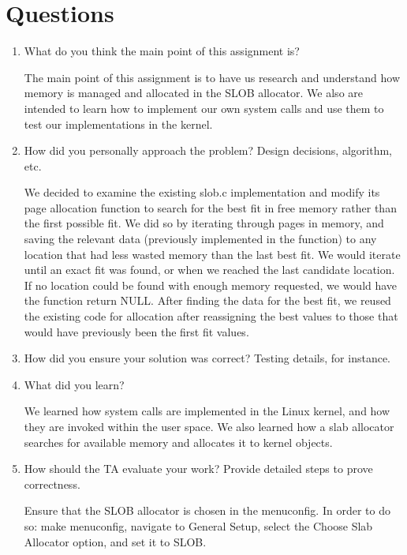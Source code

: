 \documentclass[letterpaper,10pt,fleqn]{article}
\begin{document}
\section*{Questions}
\begin{enumerate}
\item What do you think the main point of this assignment is?

The main point of this assignment is to have us research and understand how memory is managed and allocated in the SLOB allocator. We also are intended to learn how to implement our own system calls and use them to test our implementations in the kernel.

\item How did you personally approach the problem? Design decisions, algorithm, etc. 

We decided to examine the existing slob.c implementation and modify its page allocation function to search for the best fit in free memory rather than the first possible fit. We did so by iterating through pages in memory, and saving the relevant data (previously implemented in the function) to any location that had less wasted memory than the last best fit. We would iterate until an exact fit was found, or when we reached the last candidate location. If no location could be found with enough memory requested, we would have the function return NULL. 
After finding the data for the best fit, we reused the existing code for allocation after reassigning the best values to those that would have previously been the first fit values.

\item How did you ensure your solution was correct? Testing details, for instance. 



\item What did you learn? 

We learned how system calls are implemented in the Linux kernel, and how they are invoked within the user space. We also learned how a slab allocator searches for available memory and allocates it to kernel objects.

\item How should the TA evaluate your work? Provide detailed steps to prove correctness.

Ensure that the SLOB allocator is chosen in the menuconfig. In order to do so:
make menuconfig, navigate to General Setup, select the Choose Slab Allocator option, and set it to SLOB.

\end{enumerate}
\end{document}

